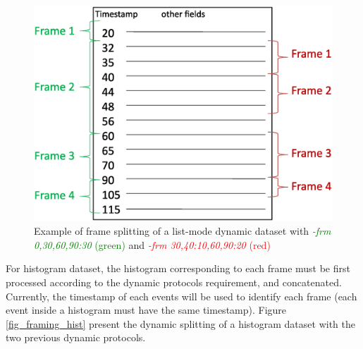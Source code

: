 \documentclass[a4paper, 11pt]{article}
\begin{document}
\bigskip
\begin{figure} [h!]
\centering
\includegraphics[width=0.49\columnwidth]{./figures/dynamic_framing_list.eps}
\caption{Example of frame splitting of a list-mode dynamic dataset with \textcolor{green}{\textit{-frm 0,30,60,90:30} (green)} and \textcolor{red}{\textit{-frm 30,40:10,60,90:20} (red)}}
\label{fig_framing_list}
\end{figure}

\bigskip

For histogram dataset, the histogram corresponding to each frame must be first processed according to the dynamic protocols requirement, and concatenated. Currently, the timestamp of each events will be used to identify each frame (each event inside a histogram must have the same timestamp). Figure \ref{fig_framing_hist} present the dynamic splitting of a histogram dataset with the two previous dynamic protocols. 
\end{document}
